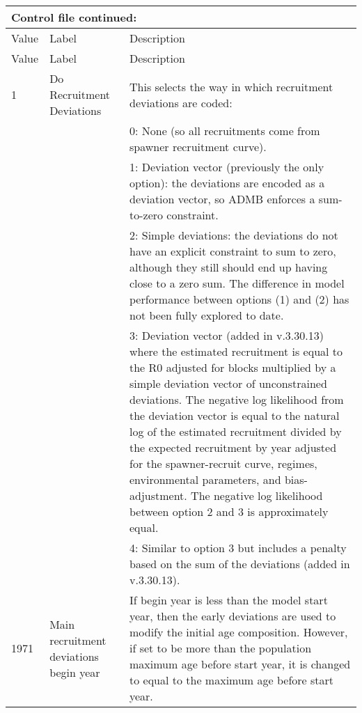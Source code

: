 \begin{longtable}{p{1cm} p{3cm} p{11cm}}
	\multicolumn{3}{l}{Control file continued:}\\

	\hline
	Value & Label &  Description\Tstrut\Bstrut\\
	\hline
	\endfirsthead

	\hline
	Value & Label &  Description\Tstrut\Bstrut\\
	\hline
	\endhead
	\hline
	\endfoot
	\endlastfoot


	1 \Tstrut & Do Recruitment Deviations & This selects the way in which recruitment deviations are coded:\\
	  &  & 0: None (so all recruitments come from spawner recruitment curve).\\
	  &  & 1: Deviation vector (previously the only option): the deviations are encoded as a deviation vector, so ADMB enforces a sum-to-zero constraint.\\
	  &  & 2: Simple deviations: the deviations do not have an explicit constraint to sum to zero, although they still should end up having close to a zero sum. The difference in model performance between options (1) and (2) has not been fully explored to date.\\
	  &  & 3: Deviation vector (added in v.3.30.13) where the estimated recruitment is equal to the R0 adjusted for blocks multiplied by a simple deviation vector of unconstrained deviations. The negative log likelihood from the deviation vector is equal to the natural log of the estimated recruitment divided by the expected recruitment by year adjusted for the spawner-recruit curve, regimes, environmental parameters, and bias-adjustment. The negative log likelihood between option 2 and 3 is approximately equal. \\
	  & & 4: Similar to option 3 but includes a penalty based on the sum of the deviations (added in v.3.30.13).\\
	\hline

	1971 \Tstrut & Main recruitment deviations begin year & If begin year is less than the model start year, then the early deviations are used to modify the initial age composition.   However, if set to be more than the population maximum age before start year, it is changed to equal to the maximum age before start year. \Bstrut\\
	\hline


\end{longtable}
